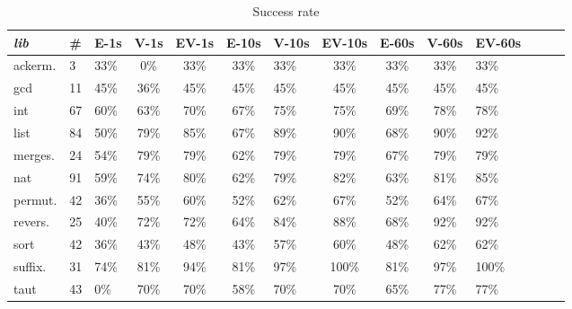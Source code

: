 \begin{table}
    \centering
    \begin{tabular}{|l|l|l|c|c|c|l|c|c|c|l|c|c|c|} \hline
    \textit{lib}&{\#}&E-1s&  V-1s&EV-1s&  E-10s&  V-10s&  EV-10s&  E-60s&  V-60s& EV-60s\\ \hline
ackerm. &3 &33\% &0\% &33\% &33\% &33\% &33\% &33\% &33\% &33\%\\ \hline
gcd &11 &45\% &36\% &45\% &45\% &45\% &45\% &45\% &45\% &45\%\\ \hline
int &67 &60\% &63\% &70\% &67\% &75\% &75\% &69\% &78\% &78\%\\ \hline
list &84 &50\% &79\% &85\% &67\% &89\% &90\% &68\% &90\% &92\%\\ \hline
merges. &24 &54\% &79\% &79\% &62\% &79\% &79\% &67\% &79\% &79\%\\ \hline
nat &91 &59\% &74\% &80\% &62\% &79\% &82\% &63\% &81\% &85\%\\ \hline
permut. &42 &36\% &55\% &60\% &52\% &62\% &67\% &52\% &64\% &67\%\\ \hline
revers. &25 &40\% &72\% &72\% &64\% &84\% &88\% &68\% &92\% &92\%\\ \hline
sort &42 &36\% &43\% &48\% &43\% &57\% &60\% &48\% &62\% &62\%\\ \hline
suffix. &31 &74\% &81\% &94\% &81\% &97\% &100\% &81\% &97\% &100\%\\ \hline
taut &43 &0\% &70\% &70\% &58\% &70\% &70\% &65\% &77\% &77\%\\ \hline
    \end{tabular}
    \caption{Success rate}
    \label{tab:success_rate}
\end{table}